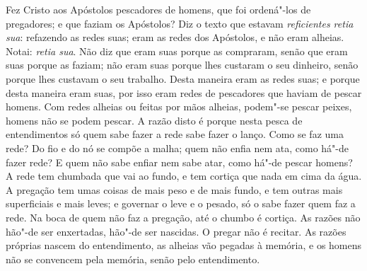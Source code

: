 Fez Cristo aos Apóstolos pescadores de homens, que foi ordená"-los de
pregadores; e que faziam os Apóstolos? Diz o texto que estavam
\emph{reficientes retia sua}: refazendo as redes suas; eram as redes
dos Apóstolos, e não eram alheias. Notai: \emph{retia sua}. Não diz que
eram suas porque as compraram, senão que eram suas porque as faziam; não
eram suas porque lhes custaram o seu dinheiro, senão porque lhes
custavam o seu trabalho. Desta maneira eram as redes suas; e porque
desta maneira eram suas, por isso eram redes de pescadores que haviam de
pescar homens. Com redes alheias ou feitas por mãos alheias, podem"-se
pescar peixes, homens não se podem pescar. A razão disto é porque nesta
pesca de entendimentos só quem sabe fazer a rede sabe fazer o lanço.
Como se faz uma rede? Do fio e do nó se compõe a malha; quem não
enfia nem ata, como há"-de fazer rede? E quem não sabe enfiar nem sabe
atar, como há"-de pescar homens? A rede tem chumbada que vai ao fundo, e
tem cortiça que nada em cima da água. A pregação tem umas coisas de mais
peso e de mais fundo, e tem outras mais superficiais e mais leves; e
governar o leve e o pesado, só o sabe fazer quem faz a rede. Na boca de
quem não faz a pregação, até o chumbo é cortiça.
As razões não hão"-de ser enxertadas, hão"-de ser nascidas. O
pregar não é recitar. As razões próprias nascem do entendimento, as
alheias vão pegadas à memória, e os homens não se convencem pela
memória, senão pelo entendimento.

